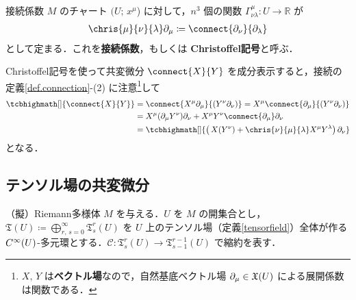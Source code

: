 \documentclass[geometry_main]{subfiles}
\begin{document}
\begin{mydef}[label=def.Christoffel]{接続係数}
	$M$ のチャート $(U;\, x^\mu$) に対して，$n^3$ 個の\cinfty 関数 $\varGamma^\mu_{\nu\lambda} \colon U \to \mathbb{R}$ が
	\begin{align} 
		\chris{\mu}{\nu}{\lambda} \partial_\mu \coloneqq \connect{\partial_\nu}{\partial_\lambda}
	\end{align}
	として定まる．これを\textbf{接続係数}，もしくは \textbf{Christoffel記号}と呼ぶ．
\end{mydef}

Christoffel記号を使って共変微分 $\connect{X}{Y}$ を成分表示すると，接続の定義\ref{def.connection}-(2) に注意\footnote{$X,\, Y$ は\textbf{ベクトル場}なので，自然基底ベクトル場 $\partial_\mu \in \mathfrak{X}(U)$ による展開係数は\cinfty 関数である．}して
\begin{align} 
	\tcbhighmath[]{\connect{X}{Y}} &= \connect{X^\mu \partial_\mu}{(Y^\nu \partial_\nu)} = X^\mu \connect{\partial_\mu}{(Y^\nu \partial_\nu)} \\
	&= X^\mu(\partial_\mu Y^\nu) \partial_\nu + X^\mu Y^\nu \connect{\partial_\mu} \partial_\nu \\
	&= \tcbhighmath[]{\bigl( \, X(Y^\nu) + \chris{\nu}{\mu}{\lambda} X^\mu Y^\lambda \bigr)\, \partial_\nu}
\end{align}
となる．

\subsection{テンソル場の共変微分}

（擬）Riemann多様体 $M$ を与える．$U$ を $M$ の開集合とし，$\mathfrak{T}(U) \coloneqq \bigoplus_{r,\, s = 0}^\infty \mathfrak{T}^r_s (U)$ を $U$ 上のテンソル場（定義\ref{tensorfield}）全体が作る $C^\infty(U)$-多元環とする．$\mathcal{C} \colon \mathfrak{T}^r_s(U) \to \mathfrak{T}^{r-1}_{s-1}(U)$ で縮約を表す．
\end{document}
